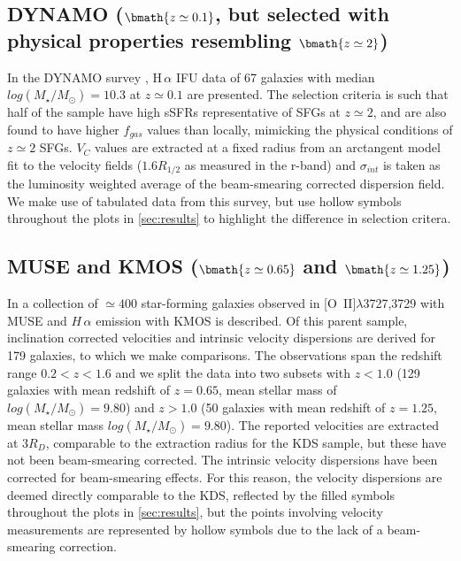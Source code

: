 \documentclass[fleqn,usenatbib]{mnras}
\begin{document}
\subsection{DYNAMO ($\bmath{z\simeq0.1}$, but selected with physical properties resembling $\bmath{z\simeq2}$)}\label{subsec:DYNAMO}
In the DYNAMO survey \citep[G14]{Green2014}, H$\,\alpha$ IFU data of 67 galaxies with median $log(M_{\star}/M_{\odot})=10.3$ at $z\simeq0.1$ are presented.
The selection criteria is such that half of the sample have high sSFRs representative of SFGs at $z\simeq2$, and are also found to have higher $f_{gas}$ values than locally, mimicking the physical conditions of $z\simeq2$ SFGs.
$V_{C}$ values are extracted at a fixed radius from an arctangent model fit to the velocity fields ($1.6R_{1/2}$ as measured in the r-band) and $\sigma_{int}$ is taken as the luminosity weighted average of the beam-smearing corrected dispersion field.
We make use of tabulated data from this survey, but use hollow symbols throughout the plots in \cref{sec:results} to highlight the difference in selection critera.

\subsection{MUSE and KMOS ($\bmath{z\simeq0.65}$ and $\bmath{z\simeq1.25}$)}\label{subsec:MUSE_and_KMOS}
In \cite{Swinbank2017} a collection of $\simeq400$ star-forming galaxies observed in [O~{\sc II}]$\lambda$3727,3729 with MUSE and $H\,\alpha$ emission with KMOS is described.
Of this parent sample, inclination corrected velocities and intrinsic velocity dispersions are derived for 179 galaxies, to which we make comparisons.
The observations span the redshift range $0.2 < z < 1.6$ and we split the data into two subsets with $z < 1.0$ (129 galaxies with mean redshift of $z = 0.65$, mean stellar mass of $log(M_{\star}/M_{\odot})=9.80$) and $z > 1.0$ (50 galaxies with mean redshift of $z = 1.25$, mean stellar mass $log(M_{\star}/M_{\odot})=9.80$).
The reported velocities are extracted at $3R_{D}$, comparable to the extraction radius for the KDS sample, but these have not been beam-smearing corrected.
The intrinsic velocity dispersions have been corrected for beam-smearing effects.
For this reason, the velocity dispersions are deemed directly comparable to the KDS, reflected by the filled symbols throughout the plots in \cref{sec:results}, but the points involving velocity measurements are represented by hollow symbols due to the lack of a beam-smearing correction.
\end{document}
